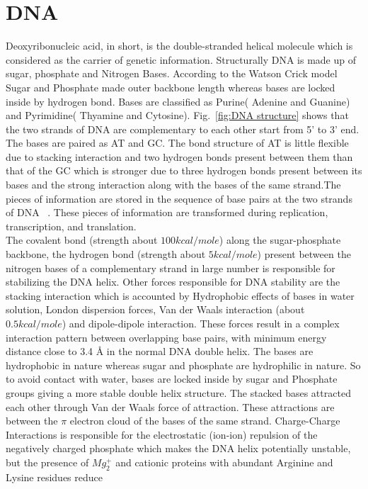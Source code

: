 \documentclass[12pt,masters,final]{UTRGVthesis}
\begin{document}
\section{DNA}
Deoxyribonucleic acid, in short, is the double-stranded helical molecule which is considered as the carrier of genetic information. Structurally DNA is made up of sugar, phosphate and Nitrogen Bases. According to the Watson Crick model~\cite{watson1953structure} Sugar and Phosphate made outer backbone length whereas bases are locked inside by hydrogen bond. Bases are classified as Purine( Adenine and Guanine) and Pyrimidine( Thyamine and Cytosine). Fig.~\ref{fig:DNA structure} shows that the two strands of DNA are complementary to each other start from 5' to 3' end. The bases are paired as AT and GC. The bond structure of AT is little flexible due to stacking interaction and two hydrogen bonds present between them than that of the GC which is stronger due to three hydrogen bonds present between its bases and the strong interaction along with the bases of the same strand.The pieces of information are stored in the sequence of base pairs at the two strands of DNA ~\cite{Calladine:2004, hanke2013denaturation}. These pieces of information are transformed during replication, transcription, and translation.\\
%
\indent
The covalent bond (strength about $100 kcal/mole$) along the sugar-phosphate backbone, the hydrogen bond (strength about $5 kcal/mole$) present between the nitrogen bases of a complementary strand in large number is responsible for stabilizing the DNA helix. Other forces responsible for DNA stability are the stacking interaction which is accounted by Hydrophobic effects of bases in water solution, London dispersion forces, Van der Waals interaction (about $0.5 kcal/mole$) and dipole-dipole interaction. These forces result in a complex interaction pattern between overlapping base pairs, with minimum energy distance close to 3.4 Å in the normal DNA double helix. The bases are hydrophobic in nature whereas sugar and phosphate are hydrophilic
in nature. So to avoid contact with water, bases are locked inside by sugar and Phosphate groups giving a more stable double helix structure. The stacked bases attracted each other through Van der Waals force of attraction. These attractions are between the $\pi$ electron cloud of the bases of the same strand. Charge-Charge Interactions is responsible for  the electrostatic (ion-ion) repulsion of the negatively charged phosphate which makes the DNA helix potentially unstable, but the presence of $Mg_{2}^{+}$ and cationic proteins with abundant  Arginine and Lysine residues reduce
\end{document}
